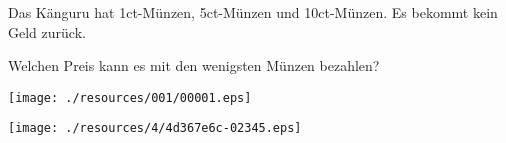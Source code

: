 Das Känguru hat 1ct-Münzen, 5ct-Münzen und 10ct-Münzen. Es bekommt kein Geld zurück.\par Welchen Preis kann es mit den wenigsten Münzen bezahlen?

\begin{center}
\texttt{[image: ./resources/001/00001.eps]}
\end{center}

\begin{center}
\texttt{[image: ./resources/4/4d367e6c-02345.eps]}
\end{center}
